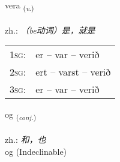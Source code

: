 \documentclass[frontgrid, backgrid]{flacards}\usepackage[]{graphicx}\usepackage[]{xcolor}
\begin{document}
\doublespacing











\renewcommand{\flhead}{\vskip5pt \fboxsep=0pt {\small\bfseries\footnotesize Sagnorð | 动词}}
\renewcommand{\fcfoot}{\vskip5pt \fboxsep=0pt \hspace{2pt}{\small\bfseries\footnotesize 1K}}

\renewcommand{\blhead}{\vskip5pt {\small\bfseries\footnotesize Sagnorð | 动词 }}
\renewcommand{\bcfoot}{\vskip5pt \hspace{2pt}{\small\bfseries\footnotesize 1K}}


{vera \small{\textsubscript{(\textit{v.})}} \\[1ex] %
\textphonetic{[vɛːra]} \\
zh.: \emph{（be动词）是，就是} \\  [2ex]
\renewcommand*{\arraystretch}{0.8}
\begin{tabular}{p{1cm}l}
\textsc{1sg}: & er -- var -- verið \\ 
\textsc{2sg}: & ert -- varst -- verið \\ 
\textsc{3sg}: & er -- var -- verið \\ 
\end{tabular}
}


\renewcommand{\flhead}{\vskip5pt \fboxsep=0pt {\small\bfseries\footnotesize Samtenging | 连词}}
\renewcommand{\fcfoot}{\vskip5pt \fboxsep=0pt \hspace{2pt}{\small\bfseries\footnotesize 1K}}

\renewcommand{\blhead}{\vskip5pt {\small\bfseries\footnotesize Samtenging | 连词 }}
\renewcommand{\bcfoot}{\vskip5pt \hspace{2pt}{\small\bfseries\footnotesize 1K}}


{og \small{\textsubscript{(\textit{conj.})}} \\[1ex]
\textphonetic{[ɔːɣ]} \\
zh.: \emph{和，也} \\  [2ex]
og (Indeclinable)}
\end{document}
